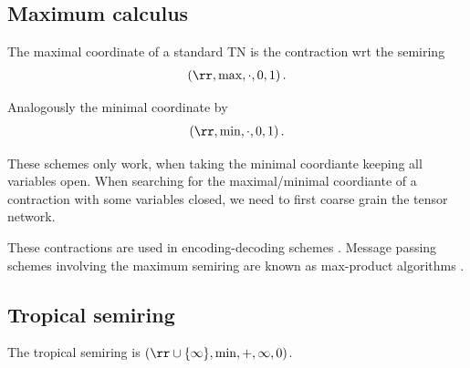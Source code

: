 \documentclass[aps,onecolumn,nofootinbib,pra]{article}
\begin{document}
    \subsection{Maximum calculus}

    The maximal coordinate of a standard TN is the contraction wrt the semiring
    \begin{align*}
        (\rr,\mathrm{max},\cdot,0,1) \, .
    \end{align*}

    Analogously the minimal coordinate by
    \begin{align*}
        (\rr,\mathrm{min},\cdot,0,1) \, .
    \end{align*}


    These schemes only work, when taking the minimal coordiante keeping all variables open.
    When searching for the maximal/minimal coordiante of a contraction with some variables closed, we need to first coarse grain the tensor network.

    These contractions are used in encoding-decoding schemes \cite{mezard_information_2009,mackay_information_2003}.
    Message passing schemes involving the maximum semiring are known as max-product algorithms \cite{koller_probabilistic_2009}.

    \subsection{Tropical semiring}

    The tropical semiring \cite{liu_tropical_2021} is $(\rr\cup\{\infty\},\mathrm{min},+,\infty,0)$.

    
    
\end{document}
